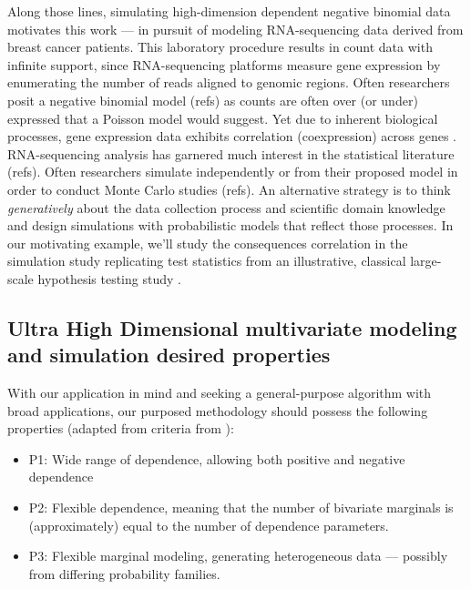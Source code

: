 \documentclass[
]{article}
\providecommand{\tightlist}{%
  \setlength{\itemsep}{0pt}\setlength{\parskip}{0pt}}
\begin{document}
Along those lines, simulating high-dimension dependent negative binomial data motivates this work --- in pursuit of modeling RNA-sequencing data \citep{Wang2009b, Conesa2016b} derived from breast cancer patients. This laboratory procedure results in count data with infinite support, since RNA-sequencing platforms measure gene expression by enumerating the number of reads aligned to genomic regions. Often researchers posit a negative binomial model (refs) as counts are often over (or under) expressed that a Poisson model would suggest. Yet due to inherent biological processes, gene expression data exhibits correlation (coexpression) across genes \citep{BE07, Schissler2018}. RNA-sequencing analysis has garnered much interest in the statistical literature (refs). Often researchers simulate independently or from their proposed model in order to conduct Monte Carlo studies (refs). An alternative strategy is to think \emph{generatively} about the data collection process and scientific domain knowledge and design simulations with probabilistic models that reflect those processes. In our motivating example, we'll study the consequences correlation in the simulation study replicating test statistics from an illustrative, classical large-scale hypothesis testing study \citep[see][]{Efron2004}.

\hypertarget{ultra-high-dimensional-multivariate-modeling-and-simulation-desired-properties}{%
\subsection{Ultra High Dimensional multivariate modeling and simulation desired properties}\label{ultra-high-dimensional-multivariate-modeling-and-simulation-desired-properties}}

With our application in mind and seeking a general-purpose algorithm with broad applications, our purposed methodology should possess the following properties (adapted from criteria from \citet{Nik13a}):

\begin{itemize}
\tightlist
\item
  P1: Wide range of dependence, allowing both positive and negative dependence
\item
  P2: Flexible dependence, meaning that the number of bivariate marginals is (approximately) equal to the number of dependence parameters.
\item
  P3: Flexible marginal modeling, generating heterogeneous data --- possibly from differing probability families.
\end{itemize}
\end{document}
